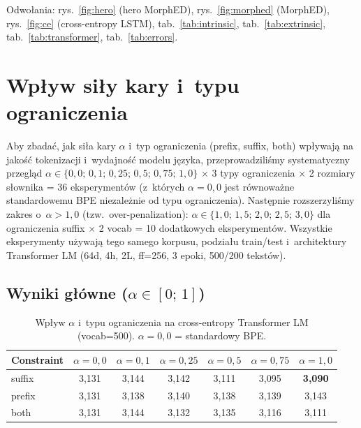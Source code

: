 Odwołania: rys.~\ref{fig:hero} (hero MorphED),
rys.~\ref{fig:morphed} (MorphED),
rys.~\ref{fig:ce} (cross-entropy LSTM),
tab.~\ref{tab:intrinsic}, tab.~\ref{tab:extrinsic},
tab.~\ref{tab:transformer}, tab.~\ref{tab:errors}.

\section{Wpływ siły kary i~typu ograniczenia}
\label{sec:penalty-sweep}

Aby zbadać, jak siła kary $\alpha$ i~typ ograniczenia
(prefix, suffix, both) wpływają na jakość tokenizacji
i~wydajność modelu języka, przeprowadziliśmy systematyczny
przegląd $\alpha \in \{0{,}0;\, 0{,}1;\, 0{,}25;\, 0{,}5;\, 0{,}75;\,
1{,}0\}$ $\times$ 3 typy ograniczenia $\times$ 2 rozmiary słownika
= 36 eksperymentów (z~których $\alpha = 0{,}0$ jest równoważne
standardowemu BPE niezależnie od typu ograniczenia).
Następnie rozszerzyliśmy zakres o~$\alpha > 1{,}0$ (tzw.\
over-penalization): $\alpha \in \{1{,}0;\, 1{,}5;\, 2{,}0;\, 2{,}5;\,
3{,}0\}$ dla ograniczenia suffix $\times$ 2 vocab = 10 dodatkowych
eksperymentów. Wszystkie eksperymenty używają tego samego korpusu,
podziału train/test i~architektury Transformer LM (64d, 4h, 2L,
ff=256, 3 epoki, 500/200 tekstów).

\subsection*{Wyniki główne ($\alpha \in [0;\,1]$)}

\begin{table}[h]
  \centering
  \caption{Wpływ $\alpha$ i~typu ograniczenia na cross-entropy
  Transformer LM (vocab=500). $\alpha = 0{,}0$ = standardowy BPE.}
  \label{tab:sweep500}
  \small
  \begin{tabular}{lcccccc}
    \toprule
    Constraint & $\alpha{=}0{,}0$ & $\alpha{=}0{,}1$ & $\alpha{=}0{,}25$ & $\alpha{=}0{,}5$ & $\alpha{=}0{,}75$ & $\alpha{=}1{,}0$ \\
    \midrule
    suffix & 3{,}131 & 3{,}144 & 3{,}142 & 3{,}111 & 3{,}095 & \textbf{3{,}090} \\
    prefix & 3{,}131 & 3{,}138 & 3{,}140 & 3{,}138 & 3{,}139 & 3{,}143 \\
    both   & 3{,}131 & 3{,}144 & 3{,}132 & 3{,}135 & 3{,}116 & 3{,}111 \\
    \bottomrule
  \end{tabular}
\end{table}

